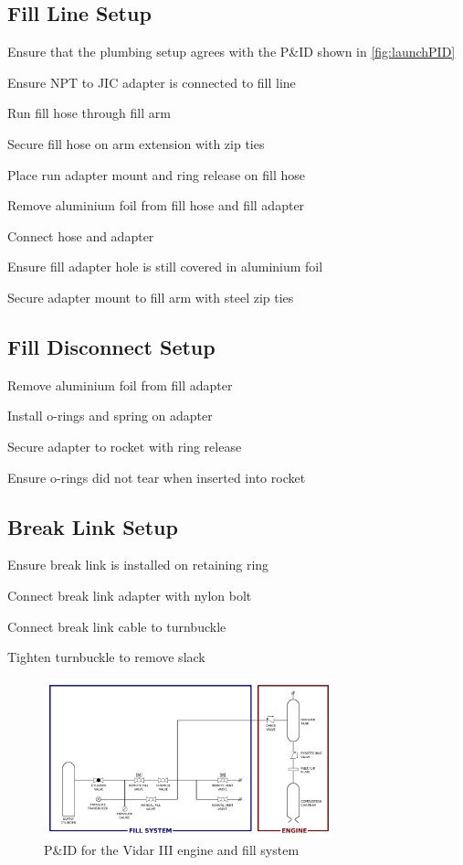     \subsection{Fill Line Setup}
    \begin{checklist}
        \item Ensure that the plumbing setup agrees with the P\&ID shown in \autoref{fig:launchPID}
        \item Ensure NPT to JIC adapter is connected to fill line
        \item Run fill hose through fill arm
        \item Secure fill hose on arm extension with zip ties
        \item Place run adapter mount and ring release on fill hose
        \item Remove aluminium foil from fill hose and fill adapter
        \item Connect hose and adapter
        \item Ensure fill adapter hole is still covered in aluminium foil
        \item Secure adapter mount to fill arm with steel zip ties
    \end{checklist}
    \subsection{Fill Disconnect Setup}
    \begin{checklist}
        \item Remove aluminium foil from fill adapter
        \item Install o-rings and spring on adapter
        \item Secure adapter to rocket with ring release
        \item Ensure o-rings did not tear when inserted into rocket
    \end{checklist}
    \subsection{Break Link Setup}
    \begin{checklist}
        \item Ensure break link is installed on retaining ring
        \item Connect break link adapter with nylon bolt
        \item Connect break link cable to turnbuckle
        \item Tighten turnbuckle to remove slack
    \end{checklist}

\begin{figure}[!htpb]
\includegraphics[width=0.75\textwidth]{images/PIDnoP}
\centering
\caption{P\&ID for the Vidar III engine and fill system}
\label{fig:launchPID}
\end{figure}



